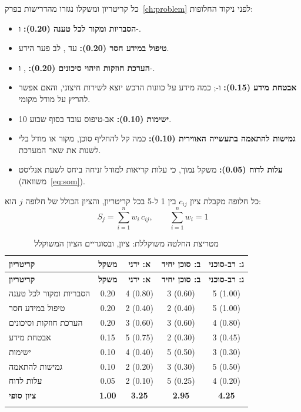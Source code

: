 כל קריטריון ומשקלו נגזרו מהדרישות בפרק~\ref{ch:problem} לפני ניקוד החלופות:
\begin{itemize}
\item \textbf{הסבריות ומקור לכל טענה (0.20):}  ו-.
\item \textbf{טיפול במידע חסר (0.20):}  עד , לב פער הידע.
\item \textbf{הערכת חוזקות וזיהוי סיכונים (0.20):} ,  ו-.
\item \textbf{אבטחת מידע (0.15):}  ו-; כמה מידע על כוונות הרכש יוצא לשירות חיצוני, והאם אפשר להריץ על מודל מקומי.
\item \textbf{ישימות (0.10):} אב-טיפוס עובד בסוף שבוע 10.
\item \textbf{גמישות להתאמה בתעשייה האווירית (0.10):} כמה קל להחליף סוכן, מקור או מודל בלי לשנות את שאר המערכת.
\item \textbf{עלות לדוח (0.05):} משקל נמוך, כי עלות קריאות למודל זניחה ביחס לשעת אנליסט (משוואה~\ref{eq:som}).
\end{itemize}

כל חלופה מקבלת ציון $c_{ij}$ בין 1 ל-5 בכל קריטריון, והציון הכולל של חלופה $j$ הוא:
\begin{equation}\label{eq:pugh}
S_j=\sum_{i=1}^{n} w_i\, c_{ij},\qquad \sum_{i=1}^{n} w_i = 1
\end{equation}

{\small
\begin{longtable}{|>{\raggedright\arraybackslash}p{4.6cm}|c|c|c|c|}
\caption{מטריצת החלטה משוקללת: ציון, ובסוגריים הציון המשוקלל}\label{tab:pugh}\\
\hline
\textbf{קריטריון} & \textbf{משקל} & \textbf{א: ידני} & \textbf{ב: סוכן יחיד} & \textbf{ג: רב-סוכני} \\ \hline
\endfirsthead
\hline
\textbf{קריטריון} & \textbf{משקל} & \textbf{א: ידני} & \textbf{ב: סוכן יחיד} & \textbf{ג: רב-סוכני} \\ \hline
\endhead
הסבריות ומקור לכל טענה & 0.20 & 4 (0.80) & 3 (0.60) & 5 (1.00) \\ \hline
טיפול במידע חסר & 0.20 & 2 (0.40) & 2 (0.40) & 5 (1.00) \\ \hline
הערכת חוזקות וסיכונים & 0.20 & 3 (0.60) & 3 (0.60) & 4 (0.80) \\ \hline
אבטחת מידע & 0.15 & 5 (0.75) & 2 (0.30) & 3 (0.45) \\ \hline
ישימות & 0.10 & 4 (0.40) & 5 (0.50) & 3 (0.30) \\ \hline
גמישות להתאמה & 0.10 & 2 (0.20) & 3 (0.30) & 5 (0.50) \\ \hline
עלות לדוח & 0.05 & 2 (0.10) & 5 (0.25) & 4 (0.20) \\ \hline
\textbf{ציון סופי} & \textbf{1.00} & \textbf{3.25} & \textbf{2.95} & \textbf{4.25} \\* \hline
\end{longtable}
}

